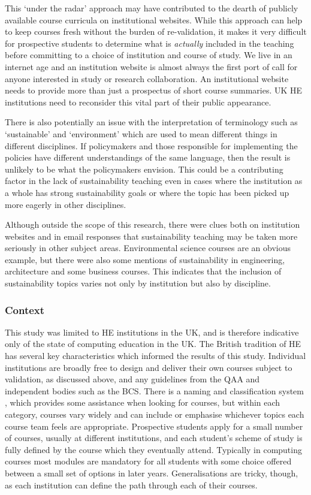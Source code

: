 This `under the radar' approach may have contributed to the dearth of publicly available course curricula on institutional websites. While this approach can help to keep courses fresh without the burden of re-validation, it makes it very difficult for prospective students to determine what is \emph{actually} included in the teaching before committing to a choice of institution and course of study. We live in an internet age and an institution website is almost always the first port of call for anyone interested in study or research collaboration. An institutional website needs to provide more than just a prospectus of short course summaries. UK HE institutions need to reconsider this vital part of their public appearance.

There is also potentially an issue with the interpretation of terminology such as `sustainable' and `environment' which are used to mean different things in different disciplines. If policymakers and those responsible for implementing the policies have different understandings of the same language, then the result is unlikely to be what the policymakers envision. This could be a contributing factor in the lack of sustainability teaching even in cases where the institution as a whole has strong sustainability goals or where the topic has been picked up more eagerly in other disciplines.

Although outside the scope of this research, there were clues both on institution websites and in email responses that sustainability teaching may be taken more seriously in other subject areas. Environmental science courses are an obvious example, but there were also some mentions of sustainability in engineering, architecture and some business courses. This indicates that the inclusion of sustainability topics varies not only by institution but also by discipline.

\subsubsection*{Context}

This study was limited to HE institutions in the UK, and is therefore indicative only of the state of computing education in the UK. The British tradition of HE has several key characteristics which informed the results of this study. Individual institutions are broadly free to design and deliver their own courses subject to validation, as discussed above, and any guidelines from the QAA and independent bodies such as the BCS. There is a naming and classification system \citep{UCAS2018}, which provides some assistance when looking for courses, but within each category, courses vary widely and can include or emphasise whichever topics each course team feels are appropriate. Prospective students apply for a small number of courses, usually at different institutions, and each student's scheme of study is fully defined by the course which they eventually attend. Typically in computing courses most modules are mandatory for all students with some choice offered between a small set of options in later years. Generalisations are tricky, though, as each institution can define the path through each of their courses.

